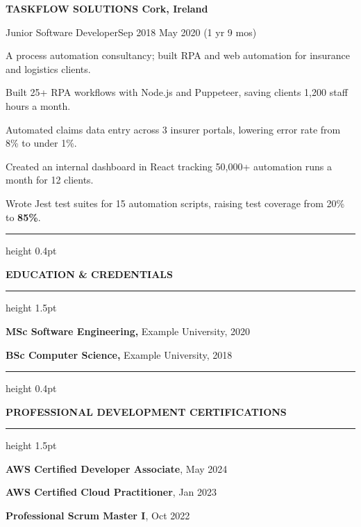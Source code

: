 \documentclass[a4paper,10pt]{article}
\newcommand{\bodyfont}{\fontsize{10.6}{13.1}\selectfont}
\newcommand{\Cap}[1]{{\fontsize{12}{13}\selectfont #1}}
\newcommand{\rsection}[1]{%
  \par\vspace{7pt}%
  {\color{textblack}\hrule height 0.4pt}%
  \vspace{3.5pt}%
  \centerline{\bfseries\fontsize{9.5}{13}\selectfont\MakeUppercase{#1}}%
  \vspace{2.5pt}%
  {\color{textblack}\hrule height 1.5pt}%
  \vspace{7pt}%
  \bodyfont
}
\newcommand{\job}[3]{%
  {\bfseries\fontsize{11}{13.2}\selectfont #1\par
   #2\hfill #3\par}%
  \vspace{4pt}\bodyfont
}
\begin{document}
\job{TASKFLOW SOLUTIONS \textendash{} Cork, Ireland}{Junior Software Developer}{Sep 2018 \textendash{} May 2020 (1 yr 9 mos)}
A process automation consultancy; built RPA and web automation for insurance and logistics clients.\par
\begin{rbullets}
  \item Built 25+ RPA workflows with Node.js and Puppeteer, saving clients 1,200 staff hours a month.
  \item Automated claims data entry across 3 insurer portals, lowering error rate from 8\% to under 1\%.
  \item Created an internal dashboard in React tracking 50,000+ automation runs a month for 12 clients.
  \item Wrote Jest test suites for 15 automation scripts, raising test coverage from 20\% to \textbf{85\%}.
\end{rbullets}

\newpage
\rsection{\Cap{E}ducation \Cap{\&} \Cap{C}redentials}
\textbf{MSc Software Engineering,} Example University, 2020\par
\vspace{6pt}
\textbf{BSc Computer Science,} Example University, 2018\par

\rsection{\Cap{P}rofessional \Cap{D}evelopment \textendash{} \Cap{C}ertifications}
\textbf{AWS Certified Developer \textendash{} Associate}, May 2024\par
\vspace{6pt}
\textbf{AWS Certified Cloud Practitioner}, Jan 2023\par
\vspace{6pt}
\textbf{Professional Scrum Master I}, Oct 2022\par
\end{document}
